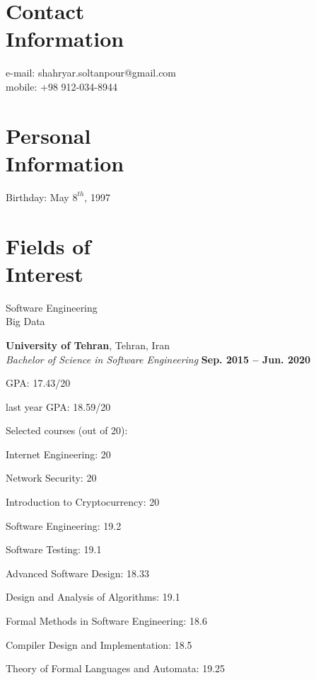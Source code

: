 \documentclass[line, mm]{sampleCV}
\begin{document}
\begin{resume}
	



    \section{\mysidestyle Contact\\Information}
    
   e-mail: shahryar.soltanpour@gmail.com\\
    mobile: +98 912-034-8944 
    
    \section{\mysidestyle Personal\\Information}
   
    Birthday: May $8^{th}$, 1997



    \section{\mysidestyle Fields of \\ Interest}
	Software Engineering\\
	Big Data

    

    \textbf{University of Tehran}, Tehran, Iran \vspace{2mm}\\\vspace{1mm}
    \textsl{Bachelor of Science in Software Engineering} \hfill \textbf{ Sep. 2015 -- Jun. 2020}\vspace{-3mm}\\\vspace{-1mm}%
    \begin{list2}
        \item GPA: 17.43/20
       	\item last year GPA: 18.59/20
		\item Selected courses (out of 20): 
		\begin{list2}
		\item Internet Engineering: 20			
		\item Network Security: 20
		\item Introduction to Cryptocurrency: 20
		\item Software Engineering: 19.2
		\item Software Testing: 19.1
		\item Advanced Software Design: 18.33
		\item Design and Analysis of Algorithms: 19.1    
		\item Formal Methods in Software Engineering: 18.6
		\item Compiler Design and Implementation: 18.5
		\item Theory of Formal Languages and Automata: 19.25
		\end{list2}
    \end{list2}\vspace{-1.5mm}


\end{resume}
\end{document}
